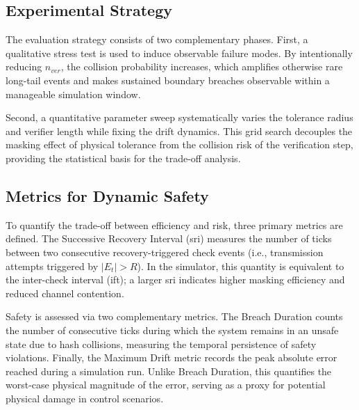 \subsection{Experimental Strategy}
The evaluation strategy consists of two complementary phases. First, a qualitative stress test is used to induce observable failure modes. By intentionally reducing $n_{ver}$, the collision probability increases, which amplifies otherwise rare long-tail events and makes sustained boundary breaches observable within a manageable simulation window.

Second, a quantitative parameter sweep systematically varies the tolerance radius and verifier length while fixing the drift dynamics. This grid search decouples the masking effect of physical tolerance from the collision risk of the verification step, providing the statistical basis for the trade-off analysis.

\subsection{Metrics for Dynamic Safety}
To quantify the trade-off between efficiency and risk, three primary metrics are defined. The Successive Recovery Interval (\gls{sri}) measures the number of ticks between two consecutive recovery-triggered check events (i.e., transmission attempts triggered by $|E_t|>R$). In the simulator, this quantity is equivalent to the inter-check interval (\gls{ift}); a larger \gls{sri} indicates higher masking efficiency and reduced channel contention.

Safety is assessed via two complementary metrics. The Breach Duration counts the number of consecutive ticks during which the system remains in an unsafe state due to hash collisions, measuring the temporal persistence of safety violations. Finally, the Maximum Drift metric records the peak absolute error reached during a simulation run. Unlike Breach Duration, this quantifies the worst-case physical magnitude of the error, serving as a proxy for potential physical damage in control scenarios.

